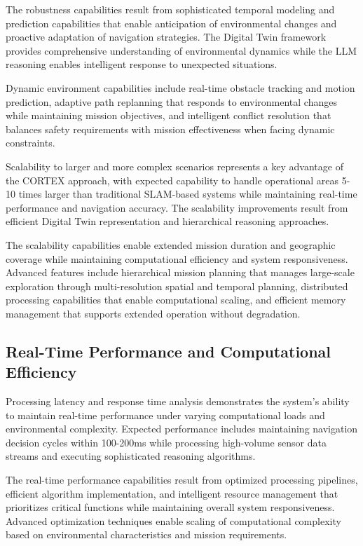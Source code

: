 The robustness capabilities result from sophisticated temporal modeling and prediction capabilities that enable anticipation of environmental changes and proactive adaptation of navigation strategies. The Digital Twin framework provides comprehensive understanding of environmental dynamics while the LLM reasoning enables intelligent response to unexpected situations.

Dynamic environment capabilities include real-time obstacle tracking and motion prediction, adaptive path replanning that responds to environmental changes while maintaining mission objectives, and intelligent conflict resolution that balances safety requirements with mission effectiveness when facing dynamic constraints.

Scalability to larger and more complex scenarios represents a key advantage of the CORTEX approach, with expected capability to handle operational areas 5-10 times larger than traditional SLAM-based systems while maintaining real-time performance and navigation accuracy. The scalability improvements result from efficient Digital Twin representation and hierarchical reasoning approaches.

The scalability capabilities enable extended mission duration and geographic coverage while maintaining computational efficiency and system responsiveness. Advanced features include hierarchical mission planning that manages large-scale exploration through multi-resolution spatial and temporal planning, distributed processing capabilities that enable computational scaling, and efficient memory management that supports extended operation without degradation.

\subsection{Real-Time Performance and Computational Efficiency}

Processing latency and response time analysis demonstrates the system's ability to maintain real-time performance under varying computational loads and environmental complexity. Expected performance includes maintaining navigation decision cycles within 100-200ms while processing high-volume sensor data streams and executing sophisticated reasoning algorithms.

The real-time performance capabilities result from optimized processing pipelines, efficient algorithm implementation, and intelligent resource management that prioritizes critical functions while maintaining overall system responsiveness. Advanced optimization techniques enable scaling of computational complexity based on environmental characteristics and mission requirements.

